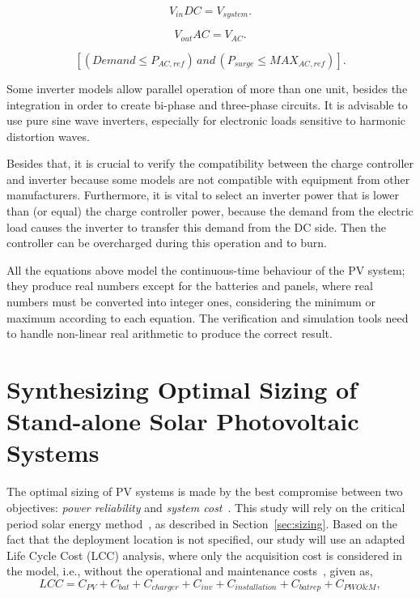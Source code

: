 \documentclass[runningheads]{llncs}
\begin{document}
\begin{equation}
\label{eq:vindc} 
V_{in}DC = V_{system}.
\end{equation}

\begin{equation}
\label{eq:voutac} 
V_{out}AC = V_{AC}.
\end{equation}

\begin{equation}
\label{eq:invcheck} 
\left[ (Demand \leq P_{AC,ref}) \, and \, (P_{surge} \leq MAX_{AC,ref}) \right].
\end{equation}

Some inverter models allow parallel operation of more than one unit, besides the integration in order to create bi-phase and three-phase circuits. It is advisable to use pure sine wave inverters, especially for electronic loads sensitive to harmonic distortion waves.

Besides that, it is crucial to verify the compatibility between the charge controller and inverter because some models are not compatible with equipment from other manufacturers. Furthermore, it is vital to select an inverter power that is lower than (or equal) the charge controller power, because the demand from the electric load causes the inverter to transfer this demand from the DC side. Then the controller can be overcharged during this operation and to burn.

All the equations above model the continuous-time behaviour of the PV system; they produce real numbers except for the batteries and panels, where real numbers must be converted into integer ones, considering the minimum or maximum according to each equation. The verification and simulation tools need to handle non-linear real arithmetic to produce the correct result.

\section{Synthesizing Optimal Sizing of Stand-alone Solar Photovoltaic Systems}

The optimal sizing of PV systems is made by the best compromise between two objectives: \textit{power reliability} and \textit{system cost}~\cite{Alsadi2018}. This study will rely on the critical period solar energy method~\cite{Pinho}, as described in Section~\ref{sec:sizing}. Based on the fact that the deployment location is not specified, our study will use an adapted Life Cycle Cost (LCC) analysis, where only the acquisition cost is considered in the model, i.e., without the operational and maintenance costs~\cite{Alsadi2018}, given as,
%
\begin{equation}
\label{eq:LCC}
LCC = C_{PV} + C_{bat} + C_{charger} + C_{inv} + C_{installation} + C_{batrep} + C_{PWO\&M},
\end{equation}
\end{document}
